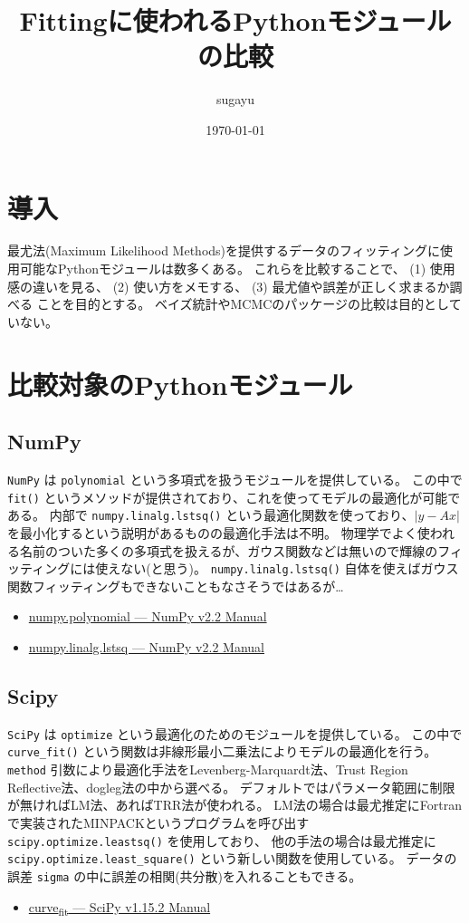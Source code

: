 \documentclass[a4paper, 8pt, notitlepage, uplatex, dvipdfmx]{jsarticle}
\author{sugayu}
\date{\today}
\title{\textbf{Fittingに使われるPythonモジュールの比較}}
\begin{document}
\maketitle
\section{導入}
\label{sec:orgd7ef9d6}
最尤法(Maximum Likelihood Methods)を提供するデータのフィッティングに使用可能なPythonモジュールは数多くある。
これらを比較することで、
(1) 使用感の違いを見る、
(2) 使い方をメモする、
(3) 最尤値や誤差が正しく求まるか調べる
ことを目的とする。
ベイズ統計やMCMCのパッケージの比較は目的としていない。
\section{比較対象のPythonモジュール}
\label{sec:orgc65a184}
\subsection{NumPy}
\label{sec:orgc24a421}
\texttt{NumPy} は \texttt{polynomial} という多項式を扱うモジュールを提供している。
この中で \texttt{fit()} というメソッドが提供されており、これを使ってモデルの最適化が可能である。
内部で \texttt{numpy.linalg.lstsq()} という最適化関数を使っており、\(|y - Ax |\) を最小化するという説明があるものの最適化手法は不明。
物理学でよく使われる名前のついた多くの多項式を扱えるが、ガウス関数などは無いので輝線のフィッティングには使えない(と思う)。
\texttt{numpy.linalg.lstsq()} 自体を使えばガウス関数フィッティングもできないこともなさそうではあるが\ldots{}
\begin{itemize}
\item \href{https://numpy.org/doc/stable/reference/routines.polynomials-package.html\#module-numpy.polynomial}{numpy.polynomial — NumPy v2.2 Manual}
\item \href{https://numpy.org/doc/stable/reference/generated/numpy.linalg.lstsq.html\#numpy.linalg.lstsq}{numpy.linalg.lstsq — NumPy v2.2 Manual}
\end{itemize}
\subsection{Scipy}
\label{sec:orgf6272cf}
\texttt{SciPy} は \texttt{optimize} という最適化のためのモジュールを提供している。
この中で \texttt{curve\_fit()} という関数は非線形最小二乗法によりモデルの最適化を行う。
\texttt{method} 引数により最適化手法をLevenberg-Marquardt法、Trust Region Reflective法、dogleg法の中から選べる。
デフォルトではパラメータ範囲に制限が無ければLM法、あればTRR法が使われる。
LM法の場合は最尤推定にFortranで実装されたMINPACKというプログラムを呼び出す \texttt{scipy.optimize.leastsq()} を使用しており、
他の手法の場合は最尤推定に \texttt{scipy.optimize.least\_square()} という新しい関数を使用している。
データの誤差 \texttt{sigma} の中に誤差の相関(共分散)を入れることもできる。
\begin{itemize}
\item \href{https://docs.scipy.org/doc/scipy/reference/generated/scipy.optimize.curve\_fit.html}{curve\textsubscript{fit} — SciPy v1.15.2 Manual}
\end{itemize}
\end{document}
